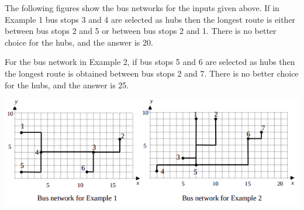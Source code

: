 The following figures show the bus networks for the inputs given above. If in Example
1 bus stops 3 and 4 are selected as hubs then the longest route is either between bus
stops 2 and 5 or between bus stops 2 and 1. There is no better choice for the hubs, and
the answer is 20.

For the bus network in Example 2, if bus stops 5 and 6 are selected as hubs then the
longest route is obtained between bus stops 2 and 7. There is no better choice for the
hubs, and the answer is 25.

\begin{center}
\includegraphics[scale=0.9]{1.png}
\end{center}